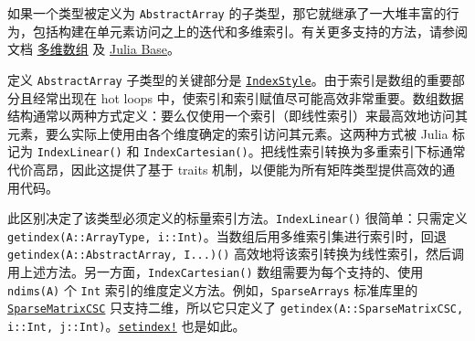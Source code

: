 



如果一个类型被定义为 \texttt{AbstractArray} 的子类型，那它就继承了一大堆丰富的行为，包括构建在单元素访问之上的迭代和多维索引。有关更多支持的方法，请参阅文档 \hyperlink{16720099245556932994}{多维数组} 及 \hyperlink{3951748617092839742}{Julia Base}。



定义 \texttt{AbstractArray} 子类型的关键部分是 \hyperlink{7782790551324367092}{\texttt{IndexStyle}}。由于索引是数组的重要部分且经常出现在 hot loops 中，使索引和索引赋值尽可能高效非常重要。数组数据结构通常以两种方式定义：要么仅使用一个索引（即线性索引）来最高效地访问其元素，要么实际上使用由各个维度确定的索引访问其元素。这两种方式被 Julia 标记为 \texttt{IndexLinear()} 和 \texttt{IndexCartesian()}。把线性索引转换为多重索引下标通常代价高昂，因此这提供了基于 traits 机制，以便能为所有矩阵类型提供高效的通用代码。



此区别决定了该类型必须定义的标量索引方法。\texttt{IndexLinear()} 很简单：只需定义 \texttt{getindex(A::ArrayType, i::Int)}。当数组后用多维索引集进行索引时，回退 \texttt{getindex(A::AbstractArray, I...)()} 高效地将该索引转换为线性索引，然后调用上述方法。另一方面，\texttt{IndexCartesian()} 数组需要为每个支持的、使用 \texttt{ndims(A)} 个 \texttt{Int} 索引的维度定义方法。例如，\texttt{SparseArrays} 标准库里的 \hyperlink{15099699527958384292}{\texttt{SparseMatrixCSC}} 只支持二维，所以它只定义了 \texttt{getindex(A::SparseMatrixCSC, i::Int, j::Int)}。\hyperlink{1309244355901386657}{\texttt{setindex!}} 也是如此。



